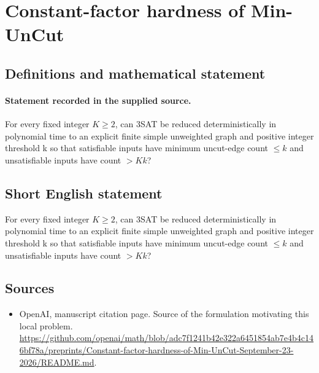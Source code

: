 \documentclass[11pt]{article}
\begin{document}
\section*{Constant-factor hardness of Min-UnCut}\label{statement}
\subsection{Definitions and mathematical statement}
\paragraph{Statement recorded in the supplied source.}
For every fixed integer $K\geq 2$, can 3SAT be reduced deterministically in polynomial time to an explicit finite simple unweighted graph and positive integer threshold k so that satisfiable inputs have minimum uncut-edge count $\leq k$ and unsatisfiable inputs have count $>Kk$?
\subsection{Short English statement}
For every fixed integer $K\geq 2$, can 3SAT be reduced deterministically in polynomial time to an explicit finite simple unweighted graph and positive integer threshold k so that satisfiable inputs have minimum uncut-edge count $\leq k$ and unsatisfiable inputs have count $>Kk$?
\subsection{Sources}
\begin{itemize}
\item[S1] OpenAI, manuscript citation page. Source of the formulation motivating this local problem.
\url{https://github.com/openai/math/blob/adc7f1241b42e322a6451854ab7e4b4c146bf78a/preprints/Constant-factor-hardness-of-Min-UnCut-September-23-2026/README.md}.
\end{itemize}
\end{document}
